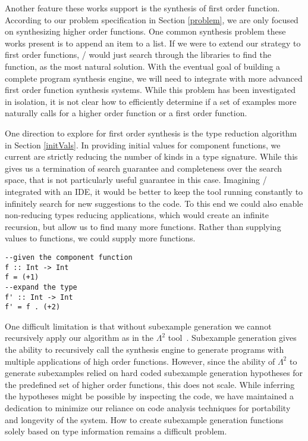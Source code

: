 Another feature these works support is the synthesis of first order function.
According to our problem specification in Section \ref{problem}, we are only focused on synthesizing higher order functions. 
One common synthesis problem these works present is to append an item to a list.
If we were to extend our strategy to first order functions, \ourTool/ would just search through the libraries to find the  function, as the most natural solution. 
With the eventual goal of building a complete program synthesis engine, we will need to integrate with more advanced first order function synthesis systems.
While this problem has been investigated in isolation, it is not clear how to efficiently determine if a set of examples more naturally calls for a higher order function or a first order function.

One direction to explore for first order synthesis is the type reduction algorithm in Section \ref{initVals}.
In providing initial values for component functions, we current are strictly reducing the number of kinds in a type signature.
While this gives us a termination of search guarantee and completeness over the search space, that is not particularly useful guarantee in this case.
Imagining \ourTool/ integrated with an IDE, it would be better to keep the tool running constantly to infinitely search for new suggestions to the code.
To this end we could also enable non-reducing types reducing applications, which would create an infinite recursion, but allow us to find many more functions.
Rather than supplying values to functions, we could supply more functions.

\begin{lstlisting}
--given the component function
f :: Int -> Int
f = (+1)
--expand the type
f' :: Int -> Int
f' = f . (+2)

\end{lstlisting} 

One difficult limitation is that without subexample generation we cannot recursively apply our algorithm as in the $\Lambda^2$ tool~\cite{Feser:2015}.
Subexample generation gives the ability to recursively call the synthesis engine to generate programs with multiple applications of high order functions.
However, since the ability of $\Lambda^2$ to generate subexamples relied on hard coded subexample generation hypotheses for the predefined set of higher order functions, this does not scale.
While inferring the hypotheses might be possible by inspecting the code, we have maintained a dedication to minimize our reliance on code analysis techniques for portability and longevity of the system. 
How to create subexample generation functions solely based on type information remains a difficult problem.
